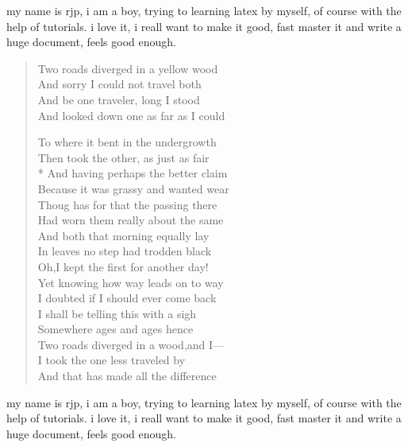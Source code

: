 \documentclass[a4paper, UTF8]{article}
\begin{document}
my name is rjp, i am a boy, trying to learning latex by myself, of course with the help of tutorials. i love it, i reall want to make it good, fast master it and write a huge document, feels good enough.

\begin{verse}
    Two roads diverged in a yellow wood\\
    And sorry I could not travel both\\
    And be one traveler, long I stood\\
    And looked down one as far as I could

    To where it bent in the undergrowth\\
    Then took the other, as just as fair\\*
    And having perhaps the better claim\\
    Because it was grassy and wanted wear\\[5pt]
    Thoug has for that the passing there\\
    Had worn them really about the same\\
    And both that morning equally lay\\
    In leaves no step had trodden black\\
    Oh,I kept the first for another day!\\
    Yet knowing how way leads on to way\\
    I doubted if I should ever come back\\
    I shall be telling this with a sigh\\
    Somewhere ages and ages hence\\
    Two roads diverged in a wood,and I—\\
    I took the one less traveled by\\
    And that has made all the difference
\end{verse}

my name is rjp, i am a boy, trying to learning latex by myself, of course with the help of tutorials. i love it, i reall want to make it good, fast master it and write a huge document, feels good enough.
\end{document}
